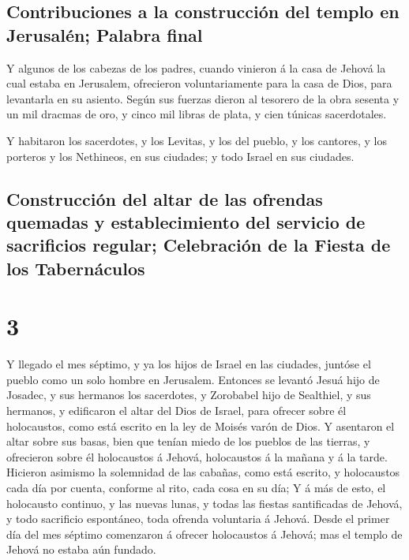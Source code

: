 \hypertarget{contribuciones-a-la-construcciuxf3n-del-templo-en-jerusaluxe9n-palabra-final}{%
\subsection{Contribuciones a la construcción del templo en Jerusalén;
Palabra
final}\label{contribuciones-a-la-construcciuxf3n-del-templo-en-jerusaluxe9n-palabra-final}}

 Y algunos de los cabezas de los padres, cuando vinieron á
la casa de Jehová la cual estaba en Jerusalem, ofrecieron
voluntariamente para la casa de Dios, para levantarla en su asiento.
 Según sus fuerzas dieron al tesorero de la obra sesenta y
un mil dracmas de oro, y cinco mil libras de plata, y cien túnicas
sacerdotales.

 Y habitaron los sacerdotes, y los Levitas, y los del
pueblo, y los cantores, y los porteros y los Nethineos, en sus ciudades;
y todo Israel en sus ciudades.

\hypertarget{construcciuxf3n-del-altar-de-las-ofrendas-quemadas-y-establecimiento-del-servicio-de-sacrificios-regular-celebraciuxf3n-de-la-fiesta-de-los-tabernuxe1culos}{%
\subsection{Construcción del altar de las ofrendas quemadas y
establecimiento del servicio de sacrificios regular; Celebración de la
Fiesta de los
Tabernáculos}\label{construcciuxf3n-del-altar-de-las-ofrendas-quemadas-y-establecimiento-del-servicio-de-sacrificios-regular-celebraciuxf3n-de-la-fiesta-de-los-tabernuxe1culos}}

\hypertarget{section-2}{%
\section{3}\label{section-2}}

 Y llegado el mes séptimo, y ya los hijos de Israel en las
ciudades, juntóse el pueblo como un solo hombre en Jerusalem.
 Entonces se levantó Jesuá hijo de Josadec, y sus hermanos
los sacerdotes, y Zorobabel hijo de Sealthiel, y sus hermanos, y
edificaron el altar del Dios de Israel, para ofrecer sobre él
holocaustos, como está escrito en la ley de Moisés varón de Dios.
 Y asentaron el altar sobre sus basas, bien que tenían miedo
de los pueblos de las tierras, y ofrecieron sobre él holocaustos á
Jehová, holocaustos á la mañana y á la tarde.  Hicieron
asimismo la solemnidad de las cabañas, como está escrito, y holocaustos
cada día por cuenta, conforme al rito, cada cosa en su día; 
Y á más de esto, el holocausto continuo, y las nuevas lunas, y todas las
fiestas santificadas de Jehová, y todo sacrificio espontáneo, toda
ofrenda voluntaria á Jehová.  Desde el primer día del mes
séptimo comenzaron á ofrecer holocaustos á Jehová; mas el templo de
Jehová no estaba aún fundado.

